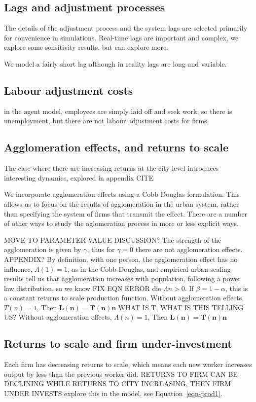 \subsection{Lags and adjustment processes}
The details of the adjustment process and the system lags are selected primarily for convenience in simulations. Real-time lags are important and complex, we explore some sensitivity results, but can explore more. 

We model a fairly short lag although in reality lags are long and variable. 

\subsection{Labour adjustment costs}

in the agent model, employees are simply laid off and seek work, so there is unemployment, but there are not \glspl{labour adjustment cost} for firms.

\subsection{Agglomeration effects, and returns to scale}
The case where there are increasing returns at the city level introduces interesting dynamics, explored in appendix CITE %

We incorporate agglomeration effects using a Cobb Douglas formulation. This allows us to focus on the results of agglomeration in the urban system, rather than specifying the system of firms that transmit the effect. 
There are a number of other ways to study the aglomeration process in more or less explicit ways.

MOVE TO PARAMETER VALUE DISCUSSION?
The strength of the agglomeration is given by $\gamma$, thus for $\gamma=0$ there are not agglomeration effects. APPENDIX?
By definition, with one person, the agglomeration effect has no influence, $\Lambda(1)=1$,  as in the \gls{Cobb-Douglas}, and empirical urban scaling results tell us that agglomeration increases with population, following a power law distribution, so we know %
FIX EQN ERROR die ${\Lambda}{n}>0$. 
If $\beta=1-\alpha$, this is a \gls{constant returns to scale} production function. Without agglomeration effects, $T(n)=1$,  Then  \textbf{$\mathbf{L(n) = T(n) n}$}  WHAT IS T, WHAT IS THIS TELLING US?
Without agglomeration effects, $\Lambda(n)=1$,  Then  \textbf{$\mathbf{L(n) = T(n) n}$} 


\subsection{Returns to scale and firm under-investment}
Each firm has \gls{decreasing returns to scale}, which means each new worker increases output by less than the previous worker did.
RETURNS TO FIRM CAN BE DECLINING WHILE RETURNS TO CITY INCREASING, THEN FIRM UNDER INVESTS
explore this in the model, see Equation~\ref{eqn-prod1}.


